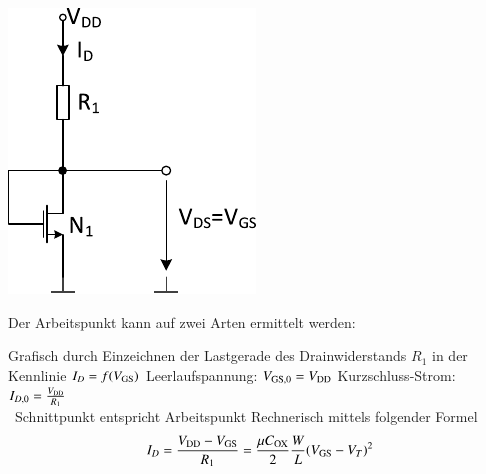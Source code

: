 \begin{minipage}[t]{0.3\columnwidth}
    \includegraphics[width=\columnwidth, align=t]{images/04_MOS_diode_mit_widerstand.pdf}
\end{minipage}
\hfill
\begin{minipage}[t]{0.66\columnwidth}
    Der Arbeitspunkt kann auf zwei Arten ermittelt werden:

    \smallskip
    
    \begin{outline}
        \1 Grafisch durch Einzeichnen der Lastgerade des Drainwiderstands $R_1$ in der Kennlinie $I_D = f(V_{\rm GS})$
            \2 Leerlaufspannung: $V_{\rm GS,0} = V_{\rm DD}$
            \2 Kurzschluss-Strom: $I_{D, 0} = \frac{V_{\rm DD}}{R_1}$ \\
            \textrightarrow\ Schnittpunkt entspricht Arbeitspunkt
            \smallskip
        \1 Rechnerisch mittels folgender Formel
        $$ I_D = \frac{V_{\rm DD} - V_{\rm GS}}{R_1} = \frac{\mu C_{\rm OX}}{2} \frac{W}{L} (V_{\rm GS} - V_T)^2 $$
    \end{outline}
\end{minipage}


